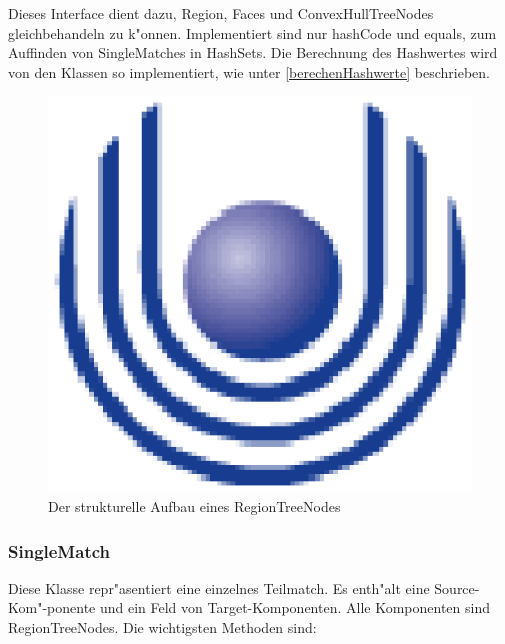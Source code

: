 Dieses Interface dient dazu, Region, Faces und ConvexHullTreeNodes gleichbehandeln zu k"onnen. Implementiert sind nur hashCode und equals, zum Auffinden von SingleMatches in HashSets. Die Berechnung des Hashwertes wird von den Klassen so implementiert, wie unter \ref{berechenHashwerte} beschrieben.

\begin{figure}
	\centering
	\includegraphics{feu_logo2.eps}
	\caption{Der strukturelle Aufbau eines RegionTreeNodes}
	\label{fig:RegionTreeNode}
\end{figure}


\subsubsection{SingleMatch}
Diese Klasse repr"asentiert eine einzelnes Teilmatch.  Es enth"alt eine Source-Kom"-ponente und ein Feld von Target-Komponenten. Alle Komponenten sind RegionTreeNodes.
Die wichtigsten Methoden sind:

